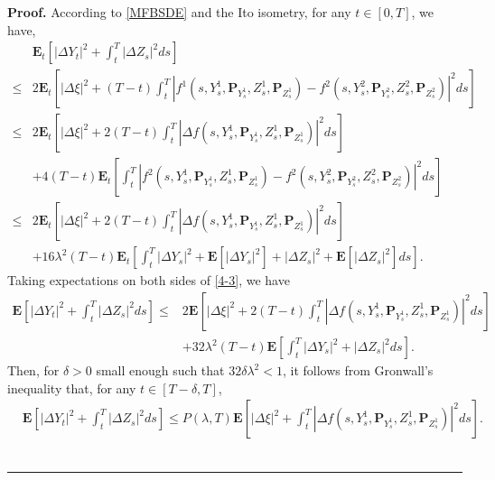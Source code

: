 \documentclass[10pt]{article}%
\numberwithin{equation}{section}
\newenvironment{proof}[1][Proof]{\noindent \textbf{#1.} }{\  \rule{0.5em}{0.5em}}
\def \E{\mathbf{E}}
\def \P{\mathbf{P}}
\begin{document}
\begin{proof}
 According to \eqref{MFBSDE} and the Ito isometry, for any $t\in[0,T]$, we have,
 \begin{equation}
     \begin{split}\label{4-3}
        &\E_t\left[\left|\Delta Y_t\right|^2+\int_{t}^{T}\left|\Delta Z_s\right|^2 ds\right]\\
        \leq& 2\E_t\left[\left|\Delta\xi\right|^2+(T-t)\int_{t}^{T}\left| f^1(s,Y_s^1,\P_{Y_s^1},Z_s^1,\P_{Z_s^1})-f^2(s,Y_s^2,\P_{Y_s^2},Z_s^2,\P_{Z_s^2})\right|^2ds\right]\\
        \leq& 2\E_t\left[\left|\Delta\xi\right|^2+2(T-t)\int_{t}^{T}\left|\Delta f(s,Y_s^1,\P_{Y_s^1},Z_s^1,\P_{Z_s^1})\right|^2ds\right]\\
        &+4(T-t)\E_t\left[\int_{t}^{T}\left| f^2(s,Y_s^1,\P_{Y_s^1},Z_s^1,\P_{Z_s^1})-f^2(s,Y_s^2,\P_{Y_s^2},Z_s^2,\P_{Z_s^2})\right|^2ds\right]\\
         \leq& 2\E_t\left[\left|\Delta\xi\right|^2+2(T-t)\int_{t}^{T}\left|\Delta f(s,Y_s^1,\P_{Y_s^1},Z_s^1,\P_{Z_s^1})\right|^2ds\right]\\
        &+16\lambda^2(T-t)\E_t\left[\int_{t}^{T}\left|\Delta Y_s\right|^2+\E\left[\left|\Delta Y_s\right|^2\right]+ \left|\Delta Z_s\right|^2+ \E\left[\left|\Delta Z_s\right|^2\right]ds\right].
     \end{split}
 \end{equation}
 Taking expectations on both sides of \eqref{4-3}, we have 
 \begin{equation*}
     \begin{split}\label{4-4}
        \E\left[\left|\Delta Y_t\right|^2+\int_{t}^{T}\left|\Delta Z_s\right|^2 ds\right]
         \leq& 2\E\left[\left|\Delta\xi\right|^2+2(T-t)\int_{t}^{T}\left|\Delta f(s,Y_s^1,\P_{Y_s^1},Z_s^1,\P_{Z_s^1})\right|^2ds\right]\\
        &+32\lambda^2(T-t)\E\left[\int_{t}^{T}\left|\Delta Y_s\right|^2+\left|\Delta Z_s\right|^2ds\right].
     \end{split}
 \end{equation*}
 Then, for $\delta>0$ small enough such that $32\delta \lambda^2<1$, it follows from Gronwall's inequality that, for any $t\in[T-\delta,T]$,
 \begin{equation}
     \begin{split}\label{4-5}
        &\E\left[\left|\Delta Y_t\right|^2+\int_{t}^{T}\left|\Delta Z_s\right|^2 ds\right]\leq P(\lambda,T)\E\left[\left|\Delta\xi\right|^2+\int_{t}^{T}\left|\Delta f(s,Y_s^1,\P_{Y_s^1},Z_s^1,\P_{Z_s^1})\right|^2ds\right].

\end{split}
\end{equation}
\end{proof}
\end{document}
